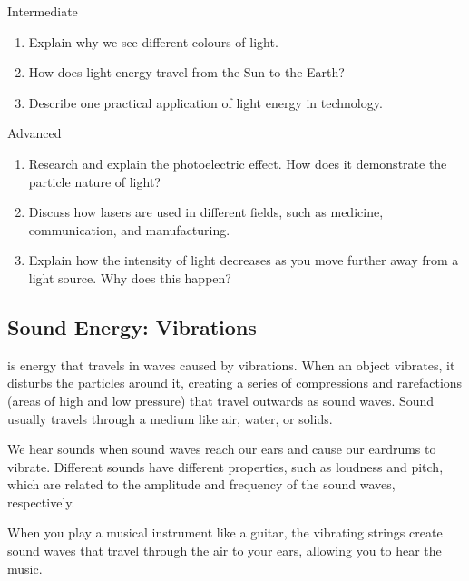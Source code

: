 \begin{tieredquestions}{Intermediate}
\begin{enumerate}
    \item Explain why we see different colours of light.
    \item How does light energy travel from the Sun to the Earth?
    \item Describe one practical application of light energy in technology.
\end{enumerate}
\end{tieredquestions}

\begin{tieredquestions}{Advanced}
\begin{enumerate}
    \item Research and explain the photoelectric effect. How does it demonstrate the particle nature of light?
    \item Discuss how lasers are used in different fields, such as medicine, communication, and manufacturing.
    \item Explain how the intensity of light decreases as you move further away from a light source.  Why does this happen?
\end{enumerate}
\end{tieredquestions}


\subsection{Sound Energy: Vibrations}

 is energy that travels in waves caused by vibrations.  When an object vibrates, it disturbs the particles around it, creating a series of compressions and rarefactions (areas of high and low pressure) that travel outwards as sound waves.  Sound usually travels through a medium like air, water, or solids.


We hear sounds when sound waves reach our ears and cause our eardrums to vibrate.  Different sounds have different properties, such as loudness and pitch, which are related to the amplitude and frequency of the sound waves, respectively.

\begin{example}
When you play a musical instrument like a guitar, the vibrating strings create sound waves that travel through the air to your ears, allowing you to hear the music.
\end{example}

